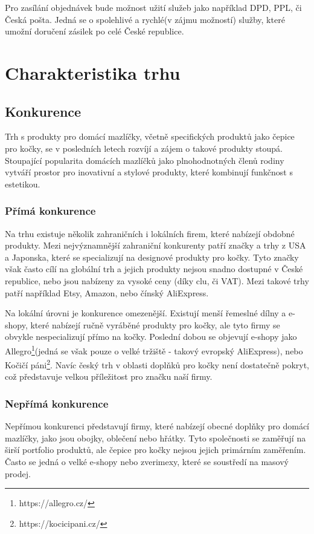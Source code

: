 \documentclass[12pt, a4paper]{article}
\begin{document}
Pro zasílání objednávek bude možnost užití služeb jako například DPD, PPL, či Česká pošta.
Jedná se o spolehlivé a rychlé(v zájmu možností) služby, které umožní doručení zásilek po celé České republice.

\pagebreak

\section{Charakteristika trhu}
\subsection{Konkurence}

Trh s produkty pro domácí mazlíčky, včetně specifických produktů jako čepice pro kočky, se v posledních letech rozvíjí a zájem o takové produkty stoupá.
Stoupající popularita domácích mazlíčků jako plnohodnotných členů rodiny vytváří prostor pro inovativní a stylové produkty, které kombinují funkčnost s estetikou.

\subsubsection{Přímá konkurence\cite{prima-konkurence}}
Na trhu existuje několik zahraničních i lokálních firem, které nabízejí obdobné produkty.
Mezi nejvýznamnější zahraniční konkurenty patří značky a trhy z USA a Japonska, které se specializují na designové produkty pro kočky.
Tyto značky však často cílí na globální trh a jejich produkty nejsou snadno dostupné v České republice, nebo jsou nabízeny za vysoké ceny
(díky clu, či VAT). Mezi takové trhy patří například Etsy, Amazon, nebo čínský AliExpress.

Na lokální úrovni je konkurence omezenější.
Existují menší řemeslné dílny a e-shopy, které nabízejí ručně vyráběné produkty pro kočky, ale tyto firmy se obvykle nespecializují přímo na kočky.
Poslední dobou se objevují e-shopy jako Allegro\footnote{https://allegro.cz/}(jedná se však pouze o velké tržiště - takový evropský AliExpress), nebo Kočičí páni\footnote{https://kocicipani.cz/}.
Navíc český trh v oblasti doplňků pro kočky není dostatečně pokryt, což představuje velkou příležitost pro značku naší firmy.

\subsubsection{Nepřímá konkurence\cite{neprima-konkurence}}
Nepřímou konkurenci představují firmy, které nabízejí obecné doplňky pro domácí mazlíčky, jako jsou obojky, oblečení nebo hřátky.
Tyto společnosti se zaměřují na širší portfolio produktů, ale čepice pro kočky nejsou jejich primárním zaměřením. Často se jedná o velké e-shopy nebo zverimexy, které se soustředí na masový prodej.
\end{document}
